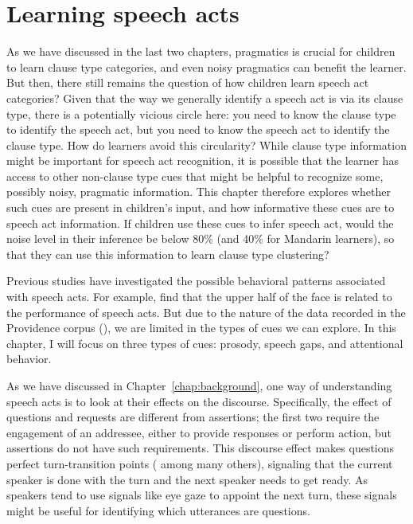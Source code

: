 \chapter{Learning speech acts}
\label{chap:eng-sp}
As we have discussed in the last two chapters, pragmatics is crucial for children to learn clause type categories, and even noisy pragmatics can benefit the learner. But then, there still remains the question of how children learn speech act categories? Given that the way we generally identify a speech act is via its clause type, there is a potentially vicious circle here: you need to know the clause type to identify the speech act, but you need to know the speech act to identify the clause type. How do learners avoid this circularity? While clause type information might be important for speech act recognition, it is possible that the learner has access to other non-clause type cues that might be helpful to recognize some, possibly noisy, pragmatic information. This chapter therefore explores whether such cues are present in children's input, and how informative these cues are to speech act information. If children use these cues to infer speech act, would the noise level in their inference be below 80\% (and 40\% for Mandarin learners), so that they can use this information to learn clause type clustering? 

Previous studies have investigated the possible behavioral patterns associated with speech acts. For example, \textcite{domaneschi2017facial} find that the upper half of the face is related to the performance of speech acts. But due to the nature of the data recorded in the Providence corpus (\citealt{ProvidenceCorpus}), we are limited in the types of cues we can explore. In this chapter, I will focus on three types of cues: prosody, speech gaps, and attentional behavior. 


As we have discussed in Chapter~\ref{chap:background}, one way of understanding speech acts is to look at their effects on the discourse. Specifically, the effect of questions and requests are different from assertions; the first two require the engagement of an addressee, either to provide responses or perform action, but assertions do not have such requirements. This discourse effect makes questions perfect turn-transition points (\cite{duncan1972turn} among many others), signaling that the current speaker is done with the turn and the next speaker needs to get ready. As speakers tend to use signals like eye gaze to appoint the next turn, these signals might be useful for identifying which utterances are questions. 

